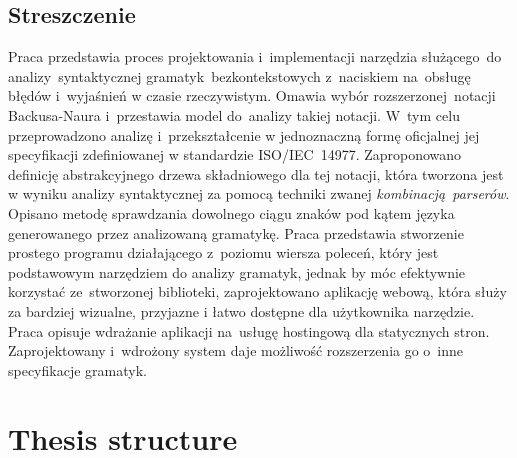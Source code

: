 \documentclass[english,bachelors,forcepolishlogotype]{wizthesis}
\begin{document}
{\let\clearpage\relax %
\begin{otherlanguage}{polish}

\chapter*{Streszczenie}

Praca przedstawia proces projektowania i~implementacji narzędzia służącego~do
analizy~syntaktycznej gramatyk~bezkontekstowych z~naciskiem na~obsługę błędów
i~wyjaśnień w czasie rzeczywistym. Omawia wybór rozszerzonej~notacji
Backusa-Naura i~przestawia model do~analizy takiej notacji. W~tym celu
przeprowadzono analizę i~przekształcenie w jednoznaczną formę oficjalnej jej
specyfikacji zdefiniowanej w standardzie ISO/IEC~14977. Zaproponowano definicję
abstrakcyjnego drzewa składniowego dla tej notacji, która tworzona jest w wyniku
analizy syntaktycznej za pomocą techniki zwanej \emph{kombinacją~parserów}.
Opisano metodę sprawdzania dowolnego ciągu znaków pod kątem języka generowanego
przez analizowaną gramatykę. Praca przedstawia stworzenie prostego programu
działającego z~poziomu wiersza poleceń, który jest podstawowym narzędziem do
analizy gramatyk, jednak by móc efektywnie korzystać ze~stworzonej biblioteki,
zaprojektowano aplikację webową, która służy za bardziej wizualne, przyjazne i
łatwo dostępne dla użytkownika narzędzie. Praca opisuje wdrażanie aplikacji
na~usługę hostingową dla statycznych stron. Zaprojektowany i~wdrożony system
daje możliwość rozszerzenia go o~inne specyfikacje gramatyk.

\end{otherlanguage}
}

\tableofcontents

\chapter*{Thesis structure}
\end{document}
